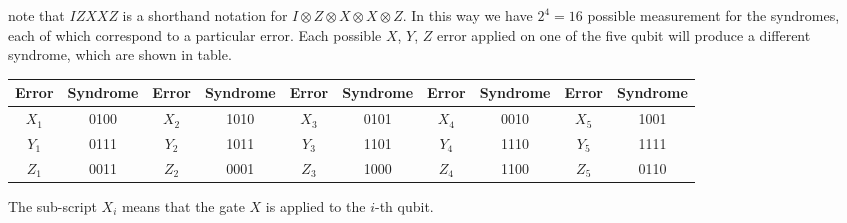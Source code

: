 \documentclass{article}
\begin{document}
 	\noindent note that $IZXXZ$ is a shorthand notation for $I\otimes Z\otimes X\otimes X\otimes Z$. In this way we have $2^4 = 16$ possible measurement for the syndromes, each of which correspond to a particular error. Each possible $X$, $Y$, $Z$ error applied on one of the five qubit will produce a different syndrome, which are shown in table. 
 	\begin{table}[H]
 		\centering
 		\begin{tabular}{|c|c|c|c|c|c|c|c|c|c|}
 			\hline
 			Error & Syndrome & Error & Syndrome & Error & Syndrome & Error & Syndrome & Error & Syndrome \\ \hline
 			$X_1$  & 0100 & $X_2$  & 1010 & $X_3$  & 0101 & $X_4$ & 0010 & $X_5$ & 1001 \\ \hline
 			$Y_1$  & 0111 & $Y_2$  & 1011 & $Y_3$  & 1101 & $Y_4$ & 1110 & $Y_5$ & 1111 \\ \hline
 			$Z_1$  & 0011 & $Z_2$  & 0001 & $Z_3$  & 1000 & $Z_4$ & 1100 & $Z_5$ & 0110 \\ \hline
 		\end{tabular}
 	\end{table}
 	The sub-script $X_i$ means that the gate $X$ is applied to the $i$-th qubit.
	 
	\newpage
	
	
\end{document}

